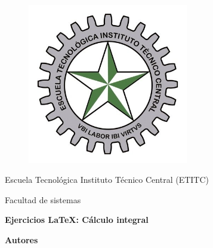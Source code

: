 \documentclass[a4paper,11pt]{book}
\begin{document}
 

\begin{titlepage} 

  

\begin{center} 

\vspace*{-1in} 

\begin{figure}[htb] 

\begin{center} 

\includegraphics[width=7cm]{ETITC.png} 

\end{center} 

\end{figure} 

  

  

{\sc \huge Escuela Tecnológica Instituto Técnico Central (ETITC)}\\ 

\vspace*{0.15in} 

Facultad de sistemas\\ 

\vspace*{0.6in} 

\begin{Large} 

\textbf{Ejercicios {\LaTeX}: Cálculo integral} \\ 

\end{Large} 

\vspace*{0.3in} 

\begin{large} 

{\bf Autores} \\ 


\end{large}
\end{center}
\end{titlepage}
\end{document}
